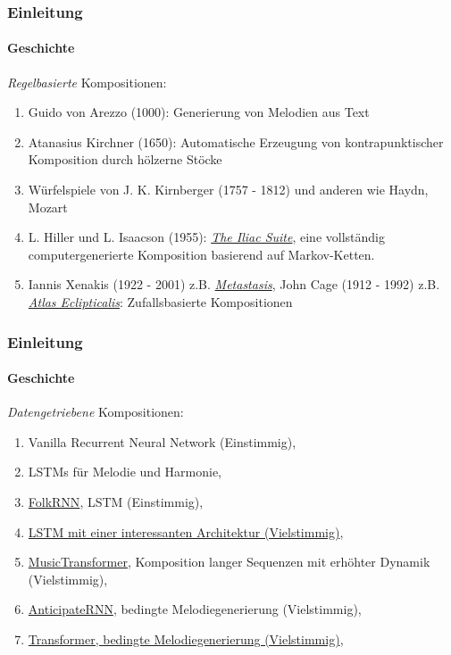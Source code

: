 \documentclass[aspectratio=169]{beamer}
\begin{document}
\begin{frame}
	\frametitle{Einleitung}
	\framesubtitle{Geschichte}
	\textit{Regelbasierte} Kompositionen:
	
	\begin{enumerate}[label=$\bullet$]
		\item Guido von Arezzo (1000): Generierung von Melodien aus Text
		\item Atanasius Kirchner (1650): Automatische Erzeugung von kontrapunktischer Komposition durch hölzerne Stöcke
		\item Würfelspiele von J. K. Kirnberger  (1757 - 1812) und anderen  wie Haydn, Mozart
		\item L. Hiller und L. Isaacson (1955): \textit{\href{https://www.youtube.com/watch?v=cuq4smO_4Js}{The Iliac Suite}}, eine vollständig computergenerierte Komposition basierend auf Markov-Ketten.
		\item Iannis Xenakis (1922 - 2001) z.B. \textit{\href{https://www.youtube.com/watch?v=SZazYFchLRI}{Metastasis}}, John Cage (1912 - 1992) z.B. \textit{\href{https://www.youtube.com/watch?v=epBkVgfoXNk}{Atlas Eclipticalis}}: Zufallsbasierte Kompositionen
	\end{enumerate}
\end{frame}

\begin{frame}
	\frametitle{Einleitung}
	\framesubtitle{Geschichte}
	\textit{Datengetriebene} Kompositionen:
	
	\begin{enumerate}[label=$\bullet$]
		\item Vanilla Recurrent Neural Network (Einstimmig), \cite{todd:1989}
		\item LSTMs für Melodie und Harmonie, \cite{eck:2002}
		\item \href{https://folkrnn.org/}{FolkRNN}, LSTM (Einstimmig), \cite{sturm:2016}
		\item \href{https://www.danieldjohnson.com/2015/08/03/composing-music-with-recurrent-neural-networks/}{LSTM mit einer interessanten Architektur (Vielstimmig)}, \cite{johnson:2017}
		\item \href{https://magenta.tensorflow.org/music-transformer}{MusicTransformer}, Komposition langer Sequenzen mit erhöhter Dynamik (Vielstimmig),  \cite{huang:2018}
		\item \href{https://sites.google.com/view/anticipation-rnn-examples/accueil}{AnticipateRNN}, bedingte Melodiegenerierung (Vielstimmig),  \cite{hadjeres:2018}
		\item \href{https://ghadjeres.github.io/piano-inpainting-application/}{Transformer, bedingte Melodiegenerierung (Vielstimmig)}, \cite{hadjeres:2021}
	\end{enumerate}
\end{frame}
\end{document}
